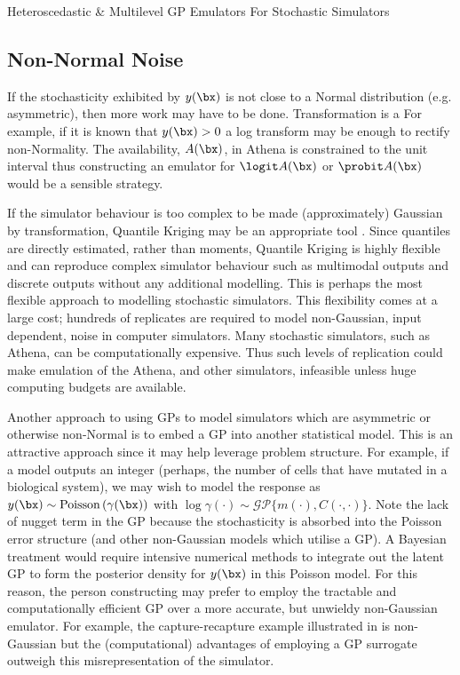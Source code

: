 \begin{chapter}{Heteroscedastic \& Multilevel GP Emulators For Stochastic Simulators\label{Ch:Hetsml}}
\subsection{Non-Normal Noise}
If the stochasticity exhibited by $y(\bx)$ is not close to a Normal distribution (e.g. asymmetric), then more work may have to be done. Transformation is a For example, if it is known that $y(\bx) > 0$ a log transform may be enough to rectify non-Normality. The availability, $A(\bx)$, in Athena is constrained to the unit interval thus constructing an emulator for $\logit A(\bx)$ or $\probit A(\bx)$ would be a sensible strategy.

If the simulator behaviour is too complex to be made (approximately) Gaussian by transformation, Quantile Kriging may be an appropriate tool \citep{Plumlee2014}. Since quantiles are directly estimated, rather than moments, Quantile Kriging is highly flexible and can reproduce complex simulator behaviour such as multimodal outputs and discrete outputs without any additional modelling. This is perhaps the most flexible approach to modelling stochastic simulators. This flexibility comes at a large cost; hundreds of replicates are required to model non-Gaussian, input dependent, noise in computer simulators. Many stochastic simulators, such as Athena, can be computationally expensive. Thus such levels of replication could make emulation of the Athena, and other simulators, infeasible unless huge computing budgets are available.

Another approach to using GPs to model simulators which are asymmetric or otherwise non-Normal is to embed a GP into another statistical model. This is an attractive approach since it may help leverage problem structure. For example, if a model outputs an integer (perhaps, the number of cells that have mutated in a biological system), we may wish to model the response as $y(\bx) \sim \text{Poisson}\,(\gamma(\bx))$ with $\log \gamma (\cdot) \sim \mathcal{GP} \{m(\cdot), C(\cdot, \cdot) \}$. Note the lack of nugget term in the GP because the stochasticity is absorbed into the Poisson error structure (and other non-Gaussian models which utilise a GP). A Bayesian treatment would require intensive numerical methods to integrate out the latent GP to form the posterior density for $y(\bx)$ in this Poisson model. For this reason, the person constructing may prefer to employ the tractable and computationally efficient GP over a more accurate, but unwieldy non-Gaussian emulator. For example, the capture-recapture example illustrated in \citet{Baker2022} is non-Gaussian but the (computational) advantages of employing a GP surrogate outweigh this misrepresentation of the simulator\georgebox.


\end{chapter}
